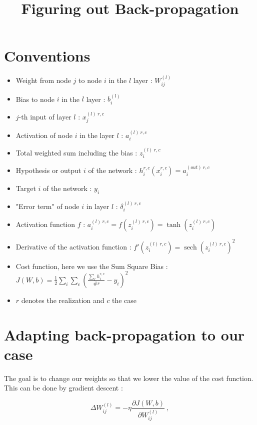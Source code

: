 \documentclass[a4paper,12pt,twoside]{article}
\DeclareMathOperator{\sech}{sech}
\begin{document}
\title{Figuring out Back-propagation}
\maketitle

\section{Conventions}
\begin{itemize}
\item Weight from node $j$ to node $i$ in the $l$ layer : $W^{(l)}_{ij}$
\item Bias to node $i$ in the $l$ layer : $b_i^{(l)}$
\item $j$-th input of layer $l$ : $x_j^{(l)~r,c}$
\item Activation of node $i$ in the layer $l$ : $a_i^{(l)~r,c}$
\item Total weighted sum including the bias : $z_i^{(l)~r,c}$
\item Hypothesis or output $i$ of the network : $h_{i}^{r,c}(x^{r,c}_i) = a^{(out)~r,c}_i$
\item Target $i$ of the network : $y_i$
\item "Error term" of node $i$ in layer $l$ : $\delta_i^{(l)~r,c}$
\item Activation function $f$ : $a_i^{(l)~r,c}=f(z_i^{(l)~r,c})=\tanh(z_i^{(l)~r,c})$
\item Derivative of the activation function : $f'(z_i^{(l)~r,c})=\sech(z_i^{(l)~r,c})^2$
\item Cost function, here we use the Sum Square Bias : \\ $J(W,b) = \frac{1}{2} \sum_i \sum_c \left( \frac{\sum_r h_{i}^{r,c}}{\#r} - y_i \right)^2$
\item $r$ denotes the realization and $c$ the case
\end{itemize}

\section{Adapting back-propagation to our case}

The goal is to change our weights so that we lower the value of the cost function. This can be done by gradient descent : 

\begin{equation}
\Delta W_{ij}^{(l)} = -\eta \frac{\partial J(W,b)}{\partial W_{ij}^{(l)}}~,
\label{graddescent}
\end{equation}
\end{document}

